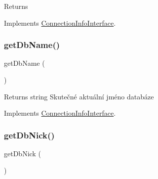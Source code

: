 \begin{DoxyReturn}{Returns}

\end{DoxyReturn}


Implements \mbox{\hyperlink{interface_pes_1_1_database_1_1_handler_1_1_connection_info_interface_ad855d2dfa322f4566b89fcc00fd0e282}{Connection\+Info\+Interface}}.

\mbox{\label{class_pes_1_1_database_1_1_handler_1_1_connection_info_a4949c3e4d80c0d275c80e0c1c3b5b280}} 
\subsubsection{\texorpdfstring{get\+Db\+Name()}{getDbName()}}
{\footnotesize\ttfamily get\+Db\+Name (\begin{DoxyParamCaption}{ }\end{DoxyParamCaption})}

\begin{DoxyReturn}{Returns}
string Skutečné aktuální jméno databáze 
\end{DoxyReturn}


Implements \mbox{\hyperlink{interface_pes_1_1_database_1_1_handler_1_1_connection_info_interface_a4949c3e4d80c0d275c80e0c1c3b5b280}{Connection\+Info\+Interface}}.

\mbox{\label{class_pes_1_1_database_1_1_handler_1_1_connection_info_a05c8fadf9d084bd94acc30760baae90f}} 
\subsubsection{\texorpdfstring{get\+Db\+Nick()}{getDbNick()}}
{\footnotesize\ttfamily get\+Db\+Nick (\begin{DoxyParamCaption}{ }\end{DoxyParamCaption})}

